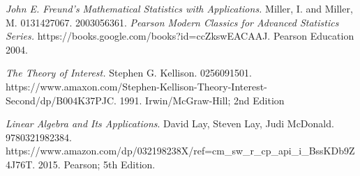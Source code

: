 \documentclass[12pt]{article}
\begin{document}
\newpage
\begin{thebibliography}{9}

\textit{John E. Freund's Mathematical Statistics with Applications.}
Miller, I. and Miller, M.
0131427067.
2003056361.
\textit{Pearson Modern Classics for Advanced Statistics Series.}
https://books.google.com/books?id=ccZkswEACAAJ.
Pearson Education 2004.

\vspace{5mm}

\textit{The Theory of Interest.}
Stephen G. Kellison.
0256091501.
https://www.amaxon.com/Stephen-Kellison-Theory-Interest-Second/dp/B004K37PJC.
1991.
Irwin/McGraw-Hill; 2nd Edition

  
\vspace{5mm}

\textit{Linear Algebra and Its Applications}.
David Lay, Steven Lay, Judi McDonald.
9780321982384.
https://www.amazon.com/dp/032198238X/ref=cm\_sw\_r\_cp\_api\_i\_BssKDb9Z4J76T.
2015.
Pearson; 5th Edition.

 

\end{thebibliography}
\end{document}
